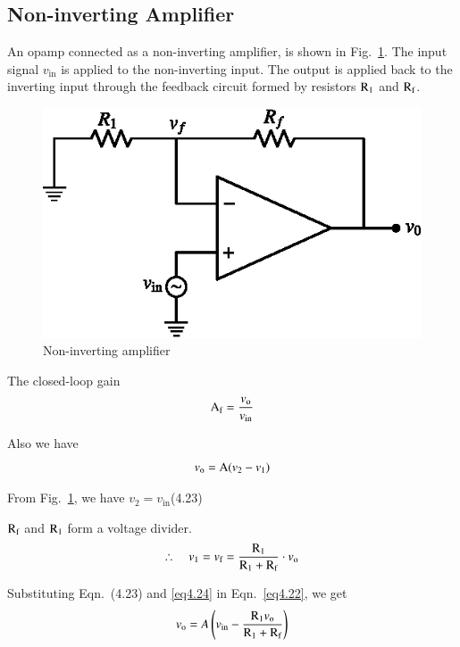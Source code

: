 \subsection{Non-inverting Amplifier}\label{sec4.6.2}

An opamp connected as a non-inverting amplifier, is shown in Fig.~\ref{fig4.8}. The input signal $v_{\text{in}}$ is applied to the non-inverting input. The output is applied back to the inverting input through the feedback circuit formed by resistors $\textrm{R}_{1}$ and $\textrm{R}_{\textrm{f}}$.
\begin{figure}[H]
\centering
\includegraphics{chap4/fig4.8.eps}
\caption{Non-inverting amplifier}\label{fig4.8}
\end{figure}


The closed-loop gain
\begin{equation}
\textrm{A}_{\textrm{f}}=\frac{v_{\textrm{o}}}{v_{\text{in}}}\label{eq4.21}
\end{equation}

Also we have
\begin{equation}
v_{\textrm{o}}=\textrm{A} (v_{2}-v_{1})\label{eq4.22}
\end{equation}

From Fig.~\ref{fig4.8}, we have $v_{2}=v_{\text{in}}$\hfill (4.23)

$\textrm{R}_{\textrm{f}}$ and $\textrm{R}_{1}$ form a voltage divider.
\setcounter{equation}{23}
\begin{equation}
\therefore\quad v_{1}=v_{\textrm{f}}=\dfrac{\textrm{R}_{1}}{\textrm{R}_{1}+\textrm{R}_{\textrm{f}}}\cdot v_{\textrm{o}}\label{eq4.24}
\end{equation}

Substituting Eqn.~(4.23) and \eqref{eq4.24} in Eqn.~\eqref{eq4.22}, we get
\begin{equation}
v_{\textrm{o}}=A\left(v_{\text{in}}-\dfrac{\textrm{R}_{1}v_{\textrm{o}}}{\textrm{R}_{1}+\textrm{R}_{\textrm{f}}}\right)\label{eq4.25}
\end{equation}

